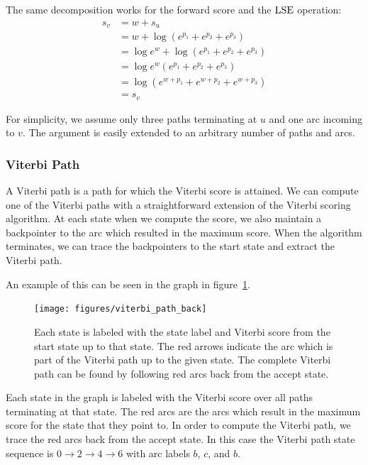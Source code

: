 The same decomposition works for the forward score and the $\operatorname*{\textrm{LSE}}$ operation:
\begin{align*}
s_v &= w + s_u  \\
    &= w + \log \left(e^{p_1} + e^{p_2} + e^{p_3}\right) \\
    &= \log e^w + \log \left(e^{p_1} + e^{p_2} + e^{p_3}\right) \\
    &= \log e^w \left(e^{p_1} + e^{p_2} + e^{p_3}\right) \\
    &= \log \left(e^{w + p_1} + e^{w + p_2} + e^{w + p_3}\right) \\
    &= s_v
\end{align*}

For simplicity, we assume only three paths terminating at $u$ and one arc
incoming to $v$. The argument is easily extended to an arbitrary number of
paths and arcs.

\subsubsection{Viterbi Path}

A Viterbi path is a path for which the Viterbi score is attained. We can
compute one of the Viterbi paths with a straightforward extension of the
Viterbi scoring algorithm. At each state when we compute the score, we also
maintain a backpointer to the arc which resulted in the maximum score. When the
algorithm terminates, we can trace the backpointers to the start state and
extract the Viterbi path.

An example of this can be seen in the graph in
figure~\ref{fig:viterbi_path_back}.

\begin{figure}
    \centering
    \texttt{[image: figures/viterbi\_path\_back]}
    \caption{Each state is labeled with the state label and Viterbi score from
    the start state up to that state. The red arrows indicate the arc which is
    part of the Viterbi path up to the given state. The complete Viterbi path
    can be found by following red arcs back from the accept state.}
    \label{fig:viterbi_path_back}
\end{figure}

Each state in the graph is labeled with the Viterbi score over all paths
terminating at that state. The red arcs are the arcs which result in the
maximum score for the state that they point to. In order to compute the Viterbi
path, we trace the red arcs back from the accept state. In this case the
Viterbi path state sequence is $0 \rightarrow 2 \rightarrow 4 \rightarrow 6$
with arc labels $b$, $c$, and $b$.


